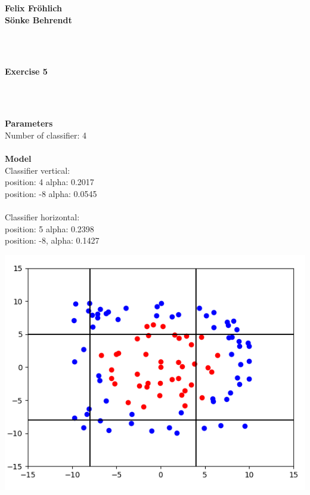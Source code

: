 \documentclass[a4paper]{article}
\begin{document}
\vspace*{-3cm}

\raggedleft
\textbf{Felix Fröhlich} \\
\textbf{Sönke Behrendt}

\centering


~\\~\\
\begin{Large}
\textbf{Exercise 5}
\end{Large}

~\\~\\
\raggedright
\textbf{Parameters}\\
Number of classifier: 4
~\\~\\
\textbf{Model}\\
Classifier vertical:\\
position: 4 alpha: 0.2017\\
position: -8 alpha: 0.0545\\
~\\
Classifier horizontal:\\
position: 5 alpha: 0.2398\\
position: -8, alpha: 0.1427


\centering
\includegraphics[width=1\textwidth]{graph.png}
\end{document}

